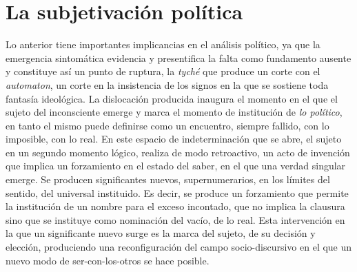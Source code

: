 \section{La subjetivación política}

Lo anterior tiene importantes implicancias en el análisis político, ya que la emergencia sintomática evidencia y presentifica la falta como fundamento ausente y constituye así un punto de ruptura, la \emph{tyché} que produce un corte con el \emph{automaton}, un corte en la insistencia de los signos en la que se sostiene toda fantasía ideológica. La dislocación producida inaugura el momento en el que el sujeto del inconsciente emerge y marca el momento de institución de \emph{lo político}, en tanto el mismo puede definirse como un encuentro, siempre fallido, con lo imposible, con lo real. En este espacio de indeterminación que se abre, el sujeto en un segundo momento lógico, realiza de modo retroactivo, un acto de invención que implica un forzamiento en el estado del saber, en el que una verdad singular emerge. Se producen significantes nuevos, supernumerarios, en los límites del sentido, del universal instituido. Es decir, se produce un forzamiento que permite la institución de un nombre para el exceso incontado, que no implica la clausura sino que se instituye como nominación del vacío, de lo real. Esta intervención en la que un significante nuevo surge es la marca del sujeto, de su decisión y elección, produciendo una reconfiguración del campo socio-discursivo en el que un nuevo modo de ser-con-los-otros se hace posible.

